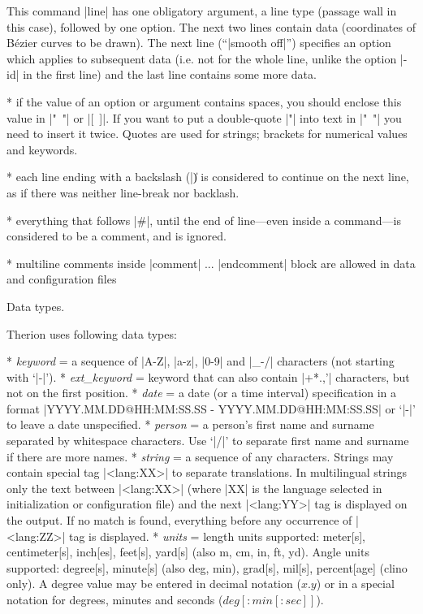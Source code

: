 This command |line| has one obligatory argument, a line type (passage wall in 
this case), followed by one option. The next two lines contain data (coordinates of 
B\'ezier curves to be drawn). The next line (``|smooth off|'') specifies an option which 
applies to subsequent data (i.e. not for the whole line, unlike the option |-id| 
in the first line) and the last line contains some more data.

* if the value of an option or argument contains spaces, you should enclose this
  value in \hbox{|" "|} or \hbox{|[ ]|}. If you want to put a double-quote |"| into 
  text in \hbox{|" "|} you need to insert it twice. Quotes are used for strings; 
  brackets for numerical values and keywords.

* each line ending with a backslash (|\|) is considered to continue on 
  the next line, as if there was neither line-break nor backlash.

* everything that follows |#|, until the end of line---even inside a command---is 
  considered to be a comment, and is ignored.

* multiline comments inside |comment| ... |endcomment| block are allowed in
  data and configuration files

\endlist


\subchapter Data types.

Therion uses following data types:

\list
* {\it keyword} = a sequence of |A-Z|, |a-z|, |0-9| and |_-/| characters 
             (not starting with `|-|').
* {\it ext\_keyword} = keyword that can also contain |+*.,'| characters, 
            but not on the first position.
* {\it date} = a date (or a time interval) specification in a format\hfil\break
          |YYYY.MM.DD@HH:MM:SS.SS - YYYY.MM.DD@HH:MM:SS.SS| or `|-|'
          to leave a date unspecified.
* {\it person} = a person's first name and surname separated by whitespace characters.
            Use `|/|' to separate first name and surname if there are 
            more names.
* {\it string} = a sequence of any characters. 
    Strings may contain special tag |<lang:XX>| to separate 
    translations.
    In multilingual strings only the text between |<lang:XX>|
    (where |XX| is the language selected in initialization 
    or configuration file) and the next |<lang:YY>| 
    tag is displayed on the output. 
    If no match is found, everything before any occurrence of
    |<lang:ZZ>| tag is displayed.
* {\it units} = length units supported: 
           meter[s], centimeter[s], inch[es], feet[s], yard[s]
           (also m, cm, in, ft, yd).
           Angle units supported: degree[s], minute[s] (also deg, min), 
	   grad[s], mil[s], percent[age] (clino only). 
           A degree value may be entered in decimal notation
	   ($x.y$) or in a special notation for degrees, minutes and seconds
	   ($deg[{:}min[{:}sec]]$).
\endlist




